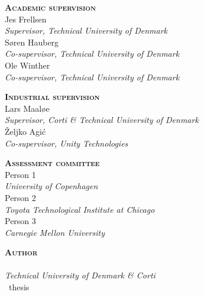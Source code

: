 
\thispagestyle{empty} %

\hfill\vfill

\noindent
\sffamily
\textsc{\textbf{Academic supervision}}
\medskip
\\Jes Frellsen\\
\textit{Supervisor, Technical University of Denmark}
\medskip
\\Søren Hauberg\\
\textit{Co-supervisor, Technical University of Denmark}
\medskip
\\Ole Winther\\
\textit{Co-supervisor, Technical University of Denmark}
\medskip

\bigskip
\noindent
\textsc{\textbf{Industrial supervision}}
\medskip
\\Lars Maaløe\\
\textit{Supervisor, Corti \& Technical University of Denmark}
\medskip
\\Željko Agi\'c\\
\textit{Co-supervisor, Unity Technologies}
\medskip

\bigskip
\noindent
\textsc{\textbf{Assessment committee}}
\medskip
\\Person 1\\
\textit{University of Copenhagen}
\medskip
\\Person 2\\
\textit{Toyota Technological Institute at Chicago}
\medskip
\\Person 3\\
\textit{Carnegie Mellon University}
\medskip

\bigskip
\noindent
\textsc{\textbf{Author}}
\medskip
\\\thesisauthor\\
\textit{Technical University of Denmark \& Corti}\\
\thesistypeabbr\ thesis\\
\textit{\thesistitle}\\
\textcopyright\ \thesismonth\ \thesisyear

\normalsize
\normalfont
